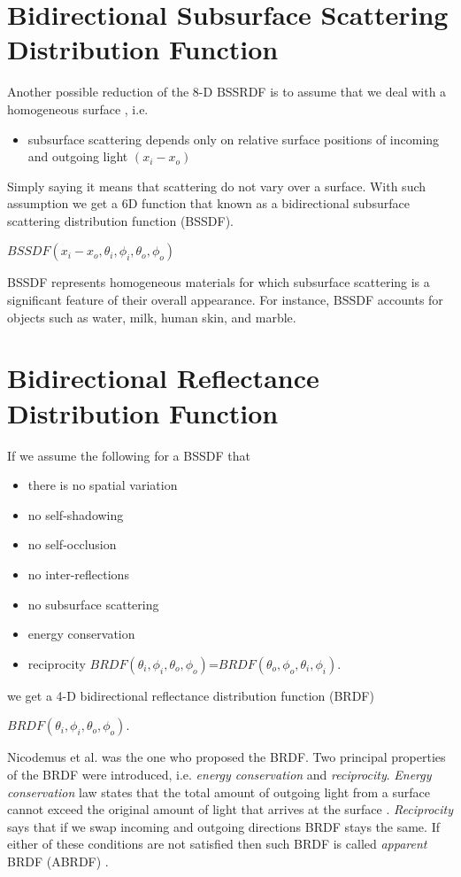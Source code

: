 \section{Bidirectional Subsurface Scattering Distribution Function}
\label{section:BSSDF}

Another possible reduction of the 8-D BSSRDF is to assume that we deal with a homogeneous surface \cite{dong}, i.e.
\begin{itemize}
 \item subsurface scattering depends only on relative surface positions of incoming and outgoing light $(x_{i}-x_{o})$
\end{itemize}
  Simply saying it means that scattering do not vary over a surface.
 With such assumption we get a 6D function that known as a bidirectional subsurface scattering
distribution function (BSSDF).
 \begin{center}
$BSSDF(x_{i}-x_{o},\theta_{i} ,\phi_{i},\theta_{o} ,\phi_{o})$
 \end{center}
 BSSDF represents homogeneous materials for which subsurface scattering is a significant feature of their overall appearance.
 For instance, BSSDF accounts for objects such as water, milk, human skin, and marble.

\section{Bidirectional Reflectance Distribution Function}
\label{section:brdf}

If we assume the following for a BSSDF that

\begin{itemize}
 \item there is no spatial variation 
 \item no self-shadowing
 \item no self-occlusion
 \item no inter-reflections
 \item no subsurface scattering
 \item energy conservation
 \item reciprocity  $BRDF(\theta_{i} ,\phi_{i},\theta_{o} ,\phi_{o})$=$BRDF(\theta_{o} ,\phi_{o},\theta_{i} ,\phi_{i})$.
\end{itemize}

 we get a 4-D bidirectional reflectance distribution function (BRDF)
 \begin{center}
$BRDF(\theta_{i} ,\phi_{i},\theta_{o} ,\phi_{o})$.
 \end{center}
Nicodemus et al. \cite{Nicodemus} was the one who proposed the BRDF. 
Two principal properties of the BRDF were introduced, i.e. \emph{energy conservation} and \emph{reciprocity}. 
\emph{Energy conservation} law states that the total amount of outgoing light from a surface cannot exceed the
original amount of light that arrives at the surface \cite{wynn}. 
 \emph{Reciprocity} says that if we swap incoming and outgoing directions BRDF stays the same.
If either of these conditions are not satisfied then such BRDF is called \emph{apparent} BRDF (ABRDF) \cite{abrdf}.

